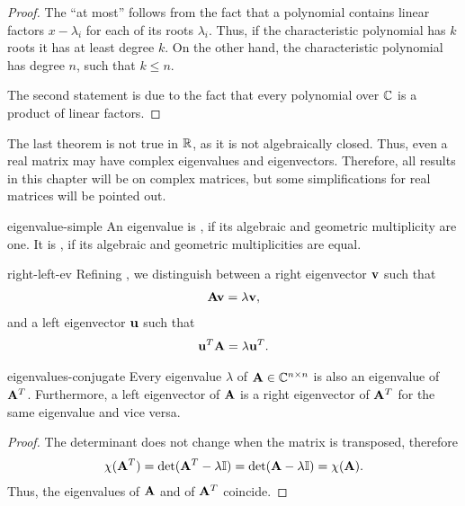 \begin{proof}
  The ``at most'' follows from the fact that a polynomial contains
  linear factors $x-\lambda_i$ for each of its roots
  $\lambda_i$. Thus, if the characteristic polynomial has $k$ roots it
  has at least degree $k$. On the other hand, the characteristic
  polynomial has degree $n$, such that $k\le n$.

  The second statement is due to the fact that every polynomial over
  $\mathbb C$ is a product of linear factors.
\end{proof}

\begin{remark}
  The last theorem is not true in $\mathbb R$, as it is not algebraically
  closed. Thus, even a real matrix may have complex eigenvalues and
  eigenvectors. Therefore, all results in this chapter will be on
  complex matrices, but some simplifications for real matrices will be
  pointed out.
\end{remark}

\begin{Definition}{eigenvalue-simple}
  An eigenvalue is , if its algebraic and geometric multiplicity are one. It is , if its algebraic and geometric multiplicities are equal.
\end{Definition}

\begin{Definition}{right-left-ev}
  Refining , we distinguish between a right eigenvector $\mathbf v$ such that
  \begin{gather*}
    \mathbf A \mathbf v = \lambda \mathbf v,
  \end{gather*}
  and a left eigenvector $\mathbf u$ such that
  \begin{gather*}
    \mathbf u^T \mathbf A = \lambda \mathbf u^T.
  \end{gather*}
  
\end{Definition}

\begin{Lemma}{eigenvalues-conjugate}
  Every eigenvalue $\lambda$ of $\mathbf A\in\mathbb C^{n\times n}$ is also an
  eigenvalue of $\mathbf A^T$. Furthermore, a left eigenvector of $\mathbf A$
  is a right eigenvector of $\mathbf A^T$ for the same eigenvalue and vice
  versa.
\end{Lemma}

\begin{proof}
  The determinant does not change when the matrix is transposed, therefore
  \begin{gather}
    \chi(\mathbf A^T)
    = \det(\mathbf A^T-\lambda \mathbb I)
    = \det(\mathbf A-\lambda \mathbb I)
    = \chi(\mathbf A).
  \end{gather}
  Thus, the eigenvalues of $\mathbf A$ and of $\mathbf A^T$ coincide.
\end{proof}

